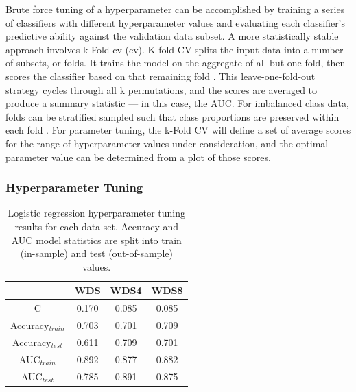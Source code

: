 Brute force tuning of a hyperparameter can be accomplished by training a series of classifiers with different hyperparameter values and evaluating each classifier's predictive ability against the validation data subset. A more statistically stable approach involves k-Fold \acrlong{cv} (\acrshort{cv}). K-fold CV splits the input data into a number of subsets, or folds. It trains the model on the aggregate of all but one fold, then scores the classifier based on that remaining fold \citep[p. 181]{james_introduction_2013}. This leave-one-fold-out strategy cycles through all k permutations, and the scores are averaged to produce a summary statistic --- in this case, the AUC. For imbalanced class data, folds can be stratified sampled such that class proportions are preserved within each fold \citep{brownlee_how_2020}. For parameter tuning, the k-Fold CV will define a set of average scores for the range of hyperparameter values under consideration, and the optimal parameter value can be determined from a plot of those scores.

\subsubsection{Hyperparameter Tuning} \label{ch5:hyper_tuning}
\begin{table}
\centering
\begin{tabular}{c|c|c|c|}
\cline{2-4}
                                 & WDS   & WDS4  & WDS8  \\ \hline
\multicolumn{1}{|c|}{C}          & 0.170 & 0.085 & 0.085 \\ \hline
\multicolumn{1}{|c|}{Accuracy$_{train}$} & 0.703 & 0.701 & 0.709 \\ \hline
\multicolumn{1}{|c|}{Accuracy$_{test}$}  & 0.611 & 0.709 & 0.701 \\ \hline
\multicolumn{1}{|c|}{AUC$_{train}$} & 0.892 & 0.877 & 0.882 \\ \hline
\multicolumn{1}{|c|}{AUC$_{test}$}  & 0.785 & 0.891 & 0.875 \\ \hline
\end{tabular}
\singlespacing
\caption[Logistic regression hyperparameter tuning results]{Logistic regression hyperparameter tuning results for each data set. Accuracy and AUC model statistics are split into train (in-sample) and test (out-of-sample) values.}
\label{tab:logreg_tuning}
\end{table}

